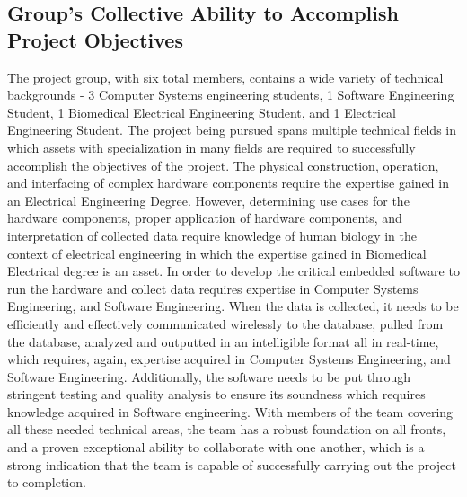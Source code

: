 \subsection{Group’s Collective Ability to Accomplish Project Objectives}

The project group, with six total members, contains a wide variety of technical backgrounds - 3 Computer Systems engineering students, 1 Software Engineering Student, 1 Biomedical Electrical Engineering Student, and 1 Electrical Engineering Student. The project being pursued spans multiple technical fields in which assets with specialization in many fields are required to successfully accomplish the objectives of the project. The physical construction, operation, and interfacing of complex hardware components require the expertise gained in an Electrical Engineering Degree. However, determining use cases for the hardware components, proper application of hardware components, and interpretation of collected data require knowledge of human biology in the context of electrical engineering in which the expertise gained in Biomedical Electrical degree is an asset. In order to develop the critical embedded software to run the hardware and collect data requires expertise in Computer Systems Engineering, and Software Engineering. When the data is collected, it needs to be efficiently and effectively communicated wirelessly to the database, pulled from the database, analyzed and outputted in an intelligible format all in real-time, which requires, again, expertise acquired in Computer Systems Engineering, and Software Engineering. Additionally, the software needs to be put through stringent testing and quality analysis to ensure its soundness which requires knowledge acquired in Software engineering. With members of the team covering all these needed technical areas, the team has a robust foundation on all fronts, and a proven exceptional ability to collaborate with one another, which is a strong indication that the team is capable of successfully carrying out the project to completion. 